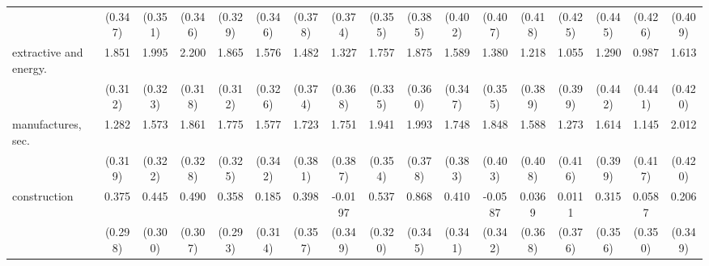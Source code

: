 {\begin{tabular}{l*{16}{c}}
                    &     (0.347)         &     (0.351)         &     (0.346)         &     (0.329)         &     (0.346)         &     (0.378)         &     (0.374)         &     (0.355)         &     (0.385)         &     (0.402)         &     (0.407)         &     (0.418)         &     (0.425)         &     (0.445)         &     (0.426)         &     (0.409)         \\
[1em]
extractive and energy.&       1.851\sym{***}&       1.995\sym{***}&       2.200\sym{***}&       1.865\sym{***}&       1.576\sym{***}&       1.482\sym{***}&       1.327\sym{***}&       1.757\sym{***}&       1.875\sym{***}&       1.589\sym{***}&       1.380\sym{***}&       1.218\sym{**} &       1.055\sym{**} &       1.290\sym{**} &       0.987\sym{*}  &       1.613\sym{***}\\
                    &     (0.312)         &     (0.323)         &     (0.318)         &     (0.312)         &     (0.326)         &     (0.374)         &     (0.368)         &     (0.335)         &     (0.360)         &     (0.347)         &     (0.355)         &     (0.389)         &     (0.399)         &     (0.442)         &     (0.441)         &     (0.420)         \\
[1em]
manufactures, sec.  &       1.282\sym{***}&       1.573\sym{***}&       1.861\sym{***}&       1.775\sym{***}&       1.577\sym{***}&       1.723\sym{***}&       1.751\sym{***}&       1.941\sym{***}&       1.993\sym{***}&       1.748\sym{***}&       1.848\sym{***}&       1.588\sym{***}&       1.273\sym{**} &       1.614\sym{***}&       1.145\sym{**} &       2.012\sym{***}\\
                    &     (0.319)         &     (0.322)         &     (0.328)         &     (0.325)         &     (0.342)         &     (0.381)         &     (0.387)         &     (0.354)         &     (0.378)         &     (0.383)         &     (0.403)         &     (0.408)         &     (0.416)         &     (0.399)         &     (0.417)         &     (0.420)         \\
[1em]
construction        &       0.375         &       0.445         &       0.490         &       0.358         &       0.185         &       0.398         &     -0.0197         &       0.537         &       0.868\sym{*}  &       0.410         &     -0.0587         &      0.0369         &      0.0111         &       0.315         &      0.0587         &       0.206         \\
                    &     (0.298)         &     (0.300)         &     (0.307)         &     (0.293)         &     (0.314)         &     (0.357)         &     (0.349)         &     (0.320)         &     (0.345)         &     (0.341)         &     (0.342)         &     (0.368)         &     (0.376)         &     (0.356)         &     (0.350)         &     (0.349)         \\

\end{tabular}}
